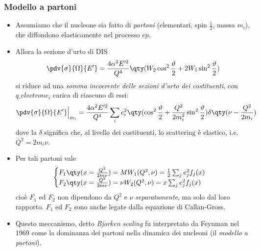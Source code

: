 \subsubsection{Modello a partoni}
\begin{itemize}
    \item Assumiamo che il nucleone sia fatto di \textit{partoni} (elementari, spin $\frac{1}{2}$, massa $m_i$), che diffondono elasticamente nel processo $ep$.
    \item Allora la sezione d'urto di DIS
    \begin{equation*}
    \pdv{\sigma}{\Omega}{E'}=\frac{4\alpha^2E'^2}{Q^4}\qty(W_2\cos^2\frac{\vartheta}{2}+2W_1\sin^2\frac{\vartheta}{2})
    \end{equation*}
    si riduce ad una \textit{somma incoerente delle sezioni d'urto dei costituenti}, con $q\_{electron}e_i$ carica di ciascuno di essi:
    \begin{equation*}
    \pdv{\sigma}{\Omega}{E'}\Big|_{m_i}=\frac{4\alpha^2E'^2}{Q^4}\sum_ie_i^2\qty(\cos^2\frac{\vartheta}{2}+\frac{Q^2}{2m_i^2}\sin^2\frac{\vartheta}{2})\delta\qty(\nu-\frac{Q^2}{2m_i})
    \end{equation*}
    dove la $\delta$ significa che, al livello dei costituenti, lo scattering è elastico, i.e. $Q^2=2m_i\nu$.
    \item Per tali partoni vale
    \begin{equation*}
	    \begin{cases}
        F_1\qty(x=\frac{Q^2}{2m\nu})=MW_1(Q^2,\nu)=\frac12\sum_je^2_jf_j(x)\\
        F_2\qty(x=\frac{Q^2}{2m\nu})=\nu W_2(Q^2,\nu)=x\sum_je^2_jf_j(x)\\
        \end{cases}
    \end{equation*}
    cioè $F_1$ ed $F_2$ non dipendono da $Q^2$ e $\nu$ \textit{separatamente}, ma solo dal loro rapporto. $F_1$ ed $F_2$ sono anche legate dalla equazione di Callan-Gross.
    \item Questo meccanismo, detto \textit{Bjorken scaling} fu interpretato da Feynman nel 1969 come la dominanza dei partoni nella dinamica dei nucleoni (il \textit{modello a partoni}).
\end{itemize}

